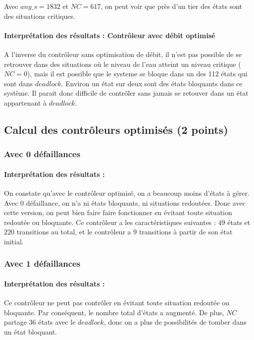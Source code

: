 \documentclass[a4paper]{book}
\begin{document}
Avec $any\_s = 1832$ et $NC=617$, on peut voir que près d'un tier des états sont des situations critiques.

\paragraph{Interprétation des résultats : Contrôleur avec débit optimisé}
A l'inverse du contrôleur sans optimisation de débit, il n'est pas possible de se retrouver dans des situations où le niveau de l'eau atteint un niveau critique ($NC = 0$), mais il est possible que le systeme se bloque dans un des 112 états qui sont dans $deadlock$.
Environ un état sur deux sont des états bloquants dans ce système. Il parait donc difficile de contrôler sans jamais se retouver dans un état appartenant à $deadlock$.

\subsection{Calcul des contrôleurs optimisés (2 points)}

\subsubsection{Avec 0 défaillances}

\paragraph{Interprétation des résultats : }
On constate qu'avec le contrôleur optimisé, on a beaucoup moins d'états à gérer.
Avec $0$ défaillance, on n'a ni états bloquants, ni situations redoutées. Donc avec cette version, on peut bien faire faire fonctionner en évitant toute situation redoutée ou bloquante.
Ce contrôleur a les caractéristiques suivantes :
$49$ états et $220$ transitions au total, et le contrôleur a $9$ transitions à partir de son état initial.

\subsubsection{Avec 1 défaillances}

\paragraph{Interprétation des résultats : }
Ce contrôleur ne peut pas contrôler en évitant toute situation redoutée ou bloquante.
Par conséquent, le nombre total d'états a augmenté. De plus, $NC$ partage 36 états avec le $deadlock$, donc on a plus de possibilités de tomber dans un état bloquant.
\end{document}
